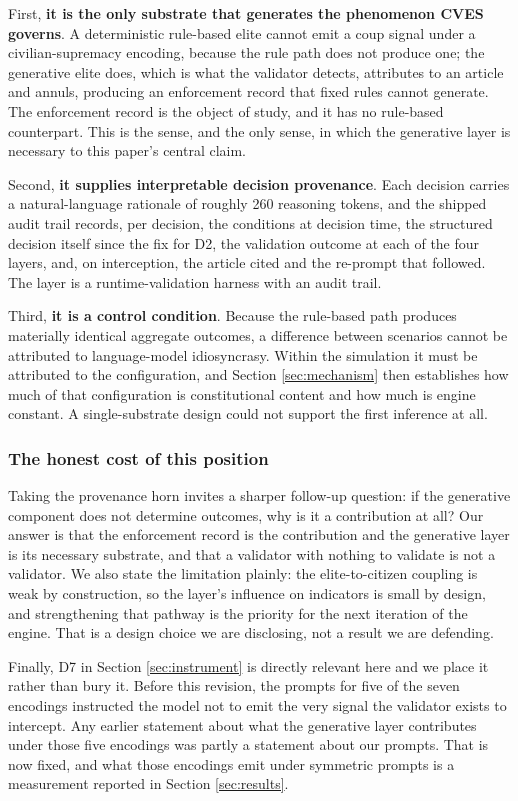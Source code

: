 \documentclass{ieeeaccess}
\begin{document}
First, \textbf{it is the only substrate that generates the phenomenon
CVES governs}. A deterministic rule-based elite cannot emit a coup
signal under a civilian-supremacy encoding, because the rule path does
not produce one; the generative elite does, which is what the validator
detects, attributes to an article and annuls, producing an enforcement
record that fixed rules cannot generate. The enforcement record is the
object of study, and it has no rule-based counterpart. This is the
sense, and the only sense, in which the generative layer is necessary to
this paper's central claim.

Second, \textbf{it supplies interpretable decision provenance}. Each
decision carries a natural-language rationale of roughly 260 reasoning
tokens, and the shipped audit trail records, per decision, the
conditions at decision time, the structured decision itself since the
fix for D2, the validation outcome at each of the four layers, and, on
interception, the article cited and the re-prompt that followed. The
layer is a runtime-validation harness with an audit trail.

Third, \textbf{it is a control condition}. Because the rule-based path
produces materially identical aggregate outcomes, a difference between
scenarios cannot be attributed to language-model idiosyncrasy. Within
the simulation it must be attributed to the configuration, and Section
\ref{sec:mechanism} then establishes how much of that configuration is
constitutional content and how much is engine constant. A
single-substrate design could not support the first inference at all.

\subsubsection{The honest cost of this position}
Taking the provenance horn invites a sharper follow-up question: if the
generative component does not determine outcomes, why is it a
contribution at all? Our answer is that the enforcement record is the
contribution and the generative layer is its necessary substrate, and
that a validator with nothing to validate is not a validator. We also
state the limitation plainly: the elite-to-citizen coupling is weak by
construction, so the layer's influence on indicators is small by design,
and strengthening that pathway is the priority for the next iteration of
the engine. That is a design choice we are disclosing, not a result we
are defending.

Finally, D7 in Section \ref{sec:instrument} is directly relevant here
and we place it rather than bury it. Before this revision, the prompts
for five of the seven encodings instructed the model not to emit the
very signal the validator exists to intercept. Any earlier statement
about what the generative layer contributes under those five encodings
was partly a statement about our prompts. That is now fixed, and what
those encodings emit under symmetric prompts is a measurement reported
in Section \ref{sec:results}.
\end{document}
